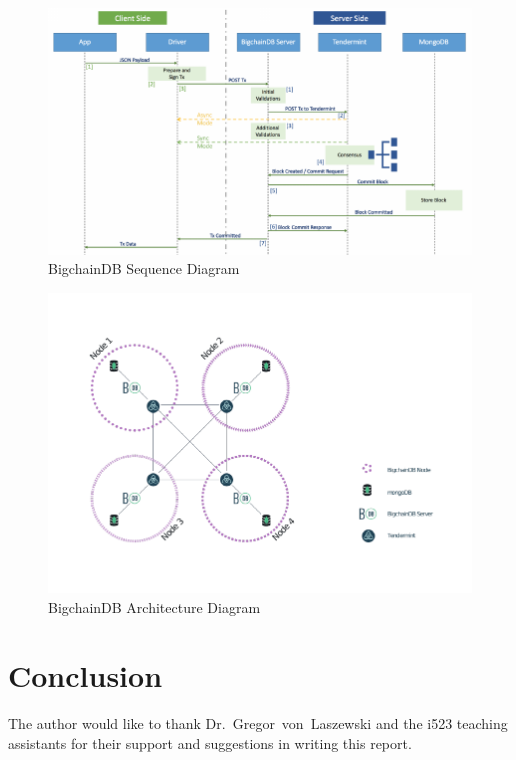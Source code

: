 \begin{figure}[!htb]
	\centering\includegraphics[width=\columnwidth]{images/bdb-seq.pdf}  
	\caption{BigchainDB Sequence Diagram~\cite{aA17}}\label{f:bdb1}
\end{figure}

\begin{figure}[!htb]
	\centering\includegraphics[width=\columnwidth]{images/bdb-arch.pdf}  
	\caption{BigchainDB Architecture Diagram~\cite{aA17}}\label{f:bdb2}
\end{figure}

\section{Conclusion}


\begin{acks}
The author would like to thank Dr.~Gregor~von~Laszewski and the i523
teaching assistants for their support and suggestions in writing this
report.
\end{acks}


 

